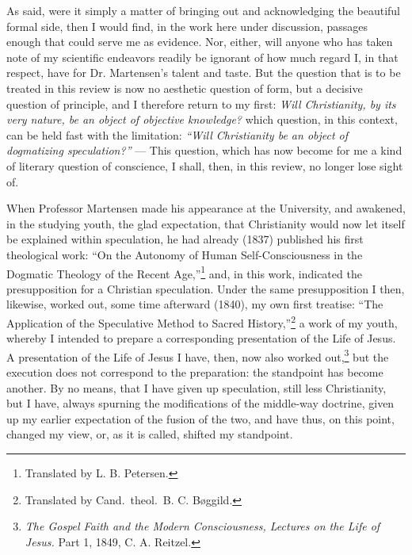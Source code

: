 \documentclass[12pt]{book}
\begin{document}
As said, were it simply a matter of bringing out and acknowledging the beautiful formal side, then I would find, in the work here under discussion, passages enough that could serve me as evidence. Nor, either, will anyone who has taken note
of my scientific endeavors readily be ignorant of how much regard I, in that respect, have for Dr. Martensen's talent and taste. But the question that is to be treated in this review is now no aesthetic question of form, but a decisive question of principle, and I therefore return to my first: \emph{Will Christianity, by its very nature, be an object of objective knowledge?} which question, in this context, can be held fast with the limitation: \emph{``Will Christianity be an object of dogmatizing speculation?''} --- This question, which has now become for me a kind of literary question of conscience, I shall, then, in this review, no longer lose sight of.

When Professor Martensen made his appearance at the University, and awakened, in the studying youth, the glad expectation, that Christianity would now let itself be explained within speculation, he had already (1837) published his first theological work: ``On the Autonomy of Human Self-Consciousness in the Dogmatic Theology of the Recent Age,''\footnote{Translated by L. B. Petersen.} and, in this work, indicated the presupposition for a Christian speculation. Under the same presupposition I then, likewise, worked out, some time afterward (1840), my own first treatise: ``The Application of the Speculative Method to Sacred History,''\footnote{Translated by Cand.\ theol.\ B. C. Bøggild.} a work of my youth, whereby
I intended to prepare a corresponding presentation of the Life of Jesus. A presentation of the Life of Jesus I have, then, now also worked out,\footnote{\textit{The Gospel Faith and the Modern Consciousness, Lectures on the Life of Jesus.} Part 1, 1849, C. A. Reitzel.} but the execution does not correspond to the preparation: the standpoint has become another. By no means, that I have given up speculation, still less Christianity, but I have, always spurning the modifications of the middle-way doctrine, given up my earlier expectation of the fusion of the two, and have thus, on this point, changed my view, or, as it is called, shifted my standpoint.
\end{document}
